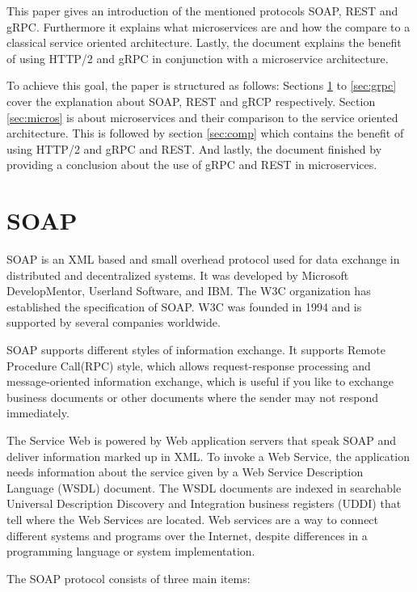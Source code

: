 \documentclass[conference]{IEEEtran}
\begin{document}
This paper gives an introduction of the mentioned protocols SOAP, REST and gRPC. Furthermore it explains what microservices are and how the compare to a classical service oriented architecture. Lastly, the document explains the benefit of using HTTP/2 and gRPC in conjunction with a microservice architecture.

To achieve this goal, the paper is structured as follows: Sections \ref{sec:soap} to \ref{sec:grpc} cover the explanation about SOAP, REST and gRCP respectively. Section \ref{sec:micros} is about microservices and their comparison to the service oriented architecture. This is followed by section \ref{sec:comp} which contains the benefit of using HTTP/2 and gRPC and REST. And lastly, the document finished by providing a conclusion about the use of gRPC and REST in microservices.

\section{SOAP}
\label{sec:soap}

SOAP is an XML based and small overhead protocol used for data exchange in distributed and decentralized systems.
It was developed by Microsoft DevelopMentor, Userland Software, and IBM. The W3C organization has established the specification of SOAP. W3C was founded in 1994 and is supported by several companies worldwide. \cite{SOA-basic-overview-2002}

SOAP supports different styles of information exchange. It supports Remote Procedure Call(RPC) style, which allows request-response processing and message-oriented information exchange, which is useful if you like to exchange business documents or other documents where the sender may not respond immediately. \cite{SOA-basic-overview-2002}

The Service Web is powered by Web application servers that speak SOAP and deliver information marked up in XML. To invoke a Web Service, the application needs information about the service given by a Web Service Description Language (WSDL) document. The WSDL documents are indexed in searchable Universal Description Discovery and Integration business registers (UDDI) that tell where the Web Services are located. \cite{SOA-basic-overview-2002} Web services are a way to connect different systems and programs over the Internet, despite differences in a programming language or system implementation.

The SOAP protocol consists of three main items:
\end{document}

